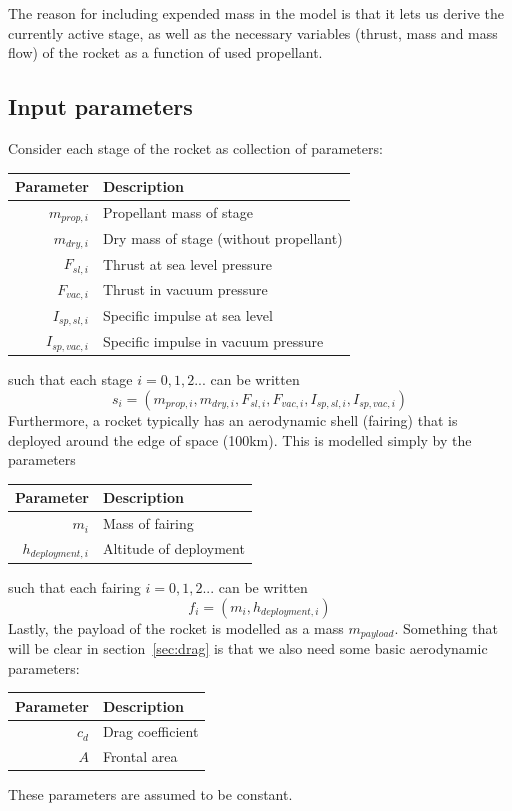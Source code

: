 \documentclass[11pt]{article}
\begin{document}
The reason for including expended mass in the model is that it lets us derive the currently active stage, 
as well as the necessary variables (thrust, mass and mass flow) of the rocket as a function of used propellant. 

\subsection{Input parameters} \label{sec:rocketparams}
Consider each stage of the rocket as collection of parameters:
\begin{center}
\begin{tabular}{ r  | l  }
  Parameter & Description \\
  \hline
  $m_{prop,i}$ & Propellant mass of stage \\
  $m_{dry,i}$ & Dry mass of stage (without propellant) \\
  $F_{sl,i}$ & Thrust at sea level pressure \\
  $F_{vac,i}$ & Thrust in vacuum pressure \\
  $I_{sp,sl,i}$ & Specific impulse at sea level \\
  $I_{sp,vac,i}$ & Specific impulse in vacuum pressure
\end{tabular}
\end{center}
such that each stage $i=0,1,2...$ can be written
$$
s_i = (m_{prop,i}, m_{dry,i}, F_{sl,i}, F_{vac,i}, I_{sp,sl,i}, I_{sp,vac,i})
$$
Furthermore, a rocket typically has an aerodynamic shell (fairing) that is deployed around the edge of space (100km). This is modelled simply by the parameters
\begin{center}
  \begin{tabular}{ r  | l  }
    Parameter & Description \\
    \hline
    $m_i$ & Mass of fairing \\
    $h_{deployment,i}$ & Altitude of deployment
  \end{tabular}
\end{center}
such that each fairing $i=0,1,2...$ can be written
$$
f_i = (m_i, h_{deployment,i})
$$
Lastly, the payload of the rocket is modelled as a mass $m_{payload}$. 
Something that will be clear in section~\ref{sec:drag} is that we also need some basic aerodynamic parameters:
\begin{center}
\begin{tabular}{ r  | l  }
  Parameter & Description \\
  \hline
  $c_d$ & Drag coefficient \\
  $A$ & Frontal area
\end{tabular}
\end{center}
These parameters are assumed to be constant.
\end{document}

